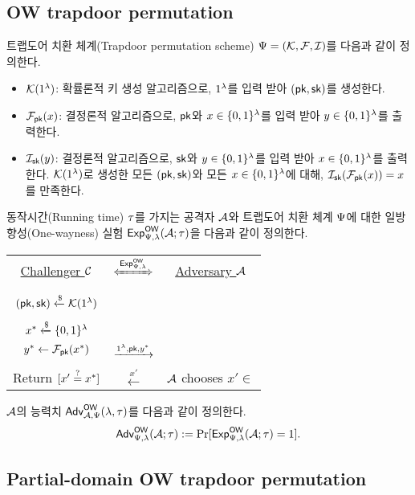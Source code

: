 \documentclass{article}
\theoremstyle{definition}
\begin{document}
\subsection{OW trapdoor permutation}
트랩도어 치환 체계(Trapdoor permutation scheme) $\tdsch = (\genkey, \td, \itd)$를 다음과
같이 정의한다.
\begin{itemize}
	\item $\genkey(1^{\sp})$: 확률론적 키 생성 알고리즘으로, $1^{\sp}$를 입력
	받아 $(\pk, \sk)$를 생성한다.
	\item $\td_{\pk}(x)$: 결정론적 알고리즘으로, $\pk$와 $x \in \set{0, 1}^{\sp}$를 입력 받아
	$y \in \set{0 ,1}^{\sp}$를 출력한다.
	\item $\itd_{\sk}(y)$: 결정론적 알고리즘으로, $\sk$와 $y \in \set{0,
	1}^{\sp}$를 입력 받아 $x \in \set{0, 1}^{\sp}$를 출력한다.
	$\genkey(1^{\sp})$로 생성한 모든 $(\pk, \sk)$와 모든 $x \in \set{0,
	1}^{\sp}$에 대해, $\itd_{\sk}(\td_{\pk}(x)) = x$를 만족한다.
\end{itemize}
동작시간(Running time) $\rt$를 가지는 공격자 $\adv$와 트랩도어 치환 체계
$\tdsch$에 대한 일방향성(One-wayness) 실험 $\Exp^{\ow}_{\tdsch, \sp}(\adv; \rt)$을
다음과 같이 정의한다.
\begin{tcolorbox}[colback=white]
	\centering
	\begin{tabularx}{\linewidth}{CcC}
		\underline{Challenger $\ch$} & $\xLeftrightarrow{\Exp^{\ow}_{\tdsch, \sp}}$ & \underline{Adversary $\adv$} \\
		\\
		$(\pk, \sk) \rgets \genkey(1^{\sp})$ & & \\
		\\
		$x^* \rgets \set{0, 1}^{\sp}$ \\ $y^* \gets \td_{\pk}(x^*)$ & $\xrightarrow{1^{\sp}, \pk, y^*}$ & \\
		\\ 
		Return $[x' \same x^*]$ & $\xleftarrow{x'}$ & $\adv$ chooses $x' \in \xspace$ \\
  \end{tabularx}
\end{tcolorbox}

$\adv$의 능력치 $\Adv^{\ow}_{\adv,
\tdsch}(\sp, \rt)$를 다음과 같이 정의한다.
$$
	\Adv^{\ow}_{\tdsch, \sp}(\adv; \rt) := \Pr[\Exp^{\ow}_{\tdsch, \sp}(\adv; \rt) = 1].
$$

\subsection{Partial-domain OW trapdoor permutation}
\end{document}

